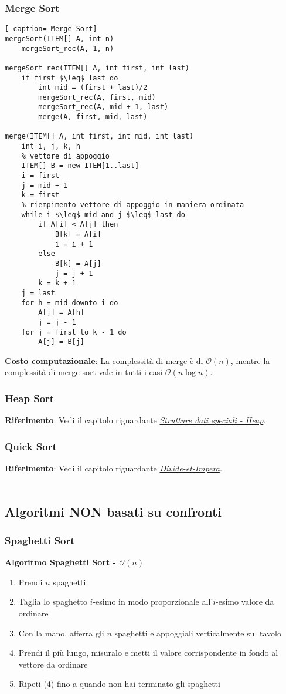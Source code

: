 \documentclass[../cheatSheetAlgoritmi.tex]{subfiles}
\begin{document}
\subsubsection{Merge Sort}
\begin{lstlisting}[ caption= Merge Sort]
mergeSort(ITEM[] A, int n)
	mergeSort_rec(A, 1, n)

mergeSort_rec(ITEM[] A, int first, int last)
  	if first $\leq$ last do
		int mid = (first + last)/2
		mergeSort_rec(A, first, mid)
		mergeSort_rec(A, mid + 1, last)
		merge(A, first, mid, last)

merge(ITEM[] A, int first, int mid, int last)
  	int i, j, k, h
  	% vettore di appoggio
  	ITEM[] B = new ITEM[1..last]
  	i = first
  	j = mid + 1
  	k = first
  	% riempimento vettore di appoggio in maniera ordinata
  	while i $\leq$ mid and j $\leq$ last do
		if A[i] < A[j] then
			B[k] = A[i]
			i = i + 1
		else  
			B[k] = A[j]
			j = j + 1
		k = k + 1
	j = last
  	for h = mid downto i do
  		A[j] = A[h]
  		j = j - 1
  	for j = first to k - 1 do
  		A[j] = B[j]
\end{lstlisting}
\textbf{Costo computazionale}: La complessità di merge è di $\mathcal{O}(n)$, mentre la complessità di merge sort vale in tutti i casi $\mathcal{O}(n\log{}n)$.\
\subsubsection{Heap Sort}
\textbf{Riferimento}: Vedi il capitolo riguardante \hyperref[sec:heap]{\emph{Strutture dati speciali - Heap}}.
\subsubsection{Quick Sort}
\textbf{Riferimento}: Vedi il capitolo riguardante \hyperref[sec:quicksort]{\emph{Divide-et-Impera}}.\\\
\subsection{Algoritmi NON basati su confronti}
\subsubsection{Spaghetti Sort}
\textbf{Algoritmo Spaghetti Sort - $\mathcal{O}(n)$}
\begin{enumerate}
	\item Prendi $n$ spaghetti
	\item Taglia lo spaghetto $i$-esimo in modo proporzionale all'$i$-esimo valore da ordinare
	\item Con la mano, afferra gli $n$ spaghetti e appoggiali verticalmente sul tavolo
	\item Prendi il più lungo, misuralo e metti il valore corrispondente in fondo al vettore da ordinare
	\item Ripeti (4) fino a quando non hai terminato gli spaghetti
\end{enumerate}
\end{document}
